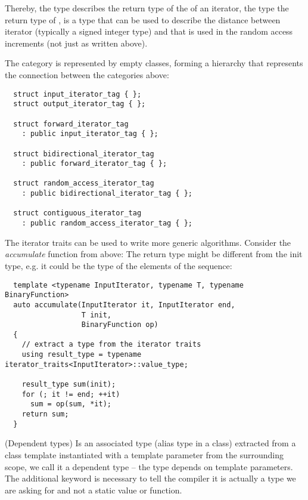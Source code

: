 Thereby, the type  describes the return type of the  of an iterator, the type  the return type of
,  is a type that can be used to describe the distance between iterator (typically a signed integer type)
and that is used in the random access increments (not just  as written above).

The category is represented by empty classes, forming a hierarchy that represents the connection between the categories above:
\begin{verbatim}
  struct input_iterator_tag { };
  struct output_iterator_tag { };

  struct forward_iterator_tag
    : public input_iterator_tag { };

  struct bidirectional_iterator_tag
    : public forward_iterator_tag { };

  struct random_access_iterator_tag
    : public bidirectional_iterator_tag { };

  struct contiguous_iterator_tag
    : public random_access_iterator_tag { };
\end{verbatim}

\begin{example}
  The iterator traits can be used to write more generic algorithms. Consider the \emph{accumulate} function from above:
  The return type might be different from the init type, e.g. it could be the type of the elements of the sequence:
  \begin{verbatim}
  template <typename InputIterator, typename T, typename BinaryFunction>
  auto accumulate(InputIterator it, InputIterator end,
                  T init,
                  BinaryFunction op)
  {
    // extract a type from the iterator traits
    using result_type = typename iterator_traits<InputIterator>::value_type;

    result_type sum(init);
    for (; it != end; ++it)
      sum = op(sum, *it);
    return sum;
  }
  \end{verbatim}
\end{example}

\begin{rem}(Dependent types)
  Is an associated type (alias type in a class) extracted from a class template instantiated with a template parameter from the surrounding scope,
  we call it a dependent type -- the type depends on template parameters. The additional keyword  is necessary to tell the compiler
  it is actually a type we are asking for and not a static value or function.
\end{rem}

